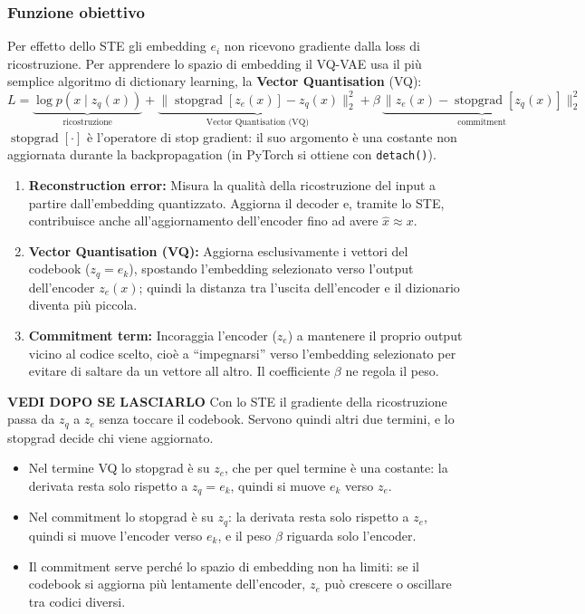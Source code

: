 \documentclass[11pt,a4paper]{article}
\begin{document}
\subsubsection{Funzione obiettivo}

Per effetto dello STE gli embedding $e_i$ non ricevono gradiente dalla loss di ricostruzione. 
Per apprendere lo spazio di embedding il VQ-VAE usa il più semplice algoritmo di dictionary learning, la \textbf{Vector Quantisation} (VQ):
\[
L=\underbrace{\log p(x\mid z_q(x))}_{\text{ricostruzione}}+\underbrace{\|\operatorname{stopgrad}[z_e(x)]-z_q(x)\|_2^2}_{\text{Vector Quantisation (VQ)}}+\beta\,\underbrace{\|z_e(x)-\operatorname{stopgrad}[z_q(x)]\|_2^2}_{\text{commitment}}
\]
$\operatorname{stopgrad}[\cdot]$ è l'operatore di stop gradient: il suo argomento è una costante non
aggiornata durante la backpropagation (in PyTorch si ottiene con \texttt{detach()}).
\begin{enumerate}
  \item \textbf{Reconstruction error:} Misura la qualità della ricostruzione del input a partire
  dall'embedding quantizzato. Aggiorna il decoder e, tramite lo STE,
  contribuisce anche all'aggiornamento dell'encoder fino ad avere $\widehat{x}\approx x$.
  \item \textbf{Vector Quantisation (VQ):} Aggiorna esclusivamente i vettori del codebook ($z_q = e_k$), 
  spostando l'embedding selezionato verso l'output dell'encoder $z_e(x)$; 
  quindi la distanza tra l'uscita dell'encoder e il dizionario diventa più piccola.
  \item \textbf{Commitment term:} Incoraggia l'encoder ($z_e$) a mantenere il proprio output
  vicino al codice scelto, cioè a ``impegnarsi'' verso l'embedding
  selezionato per evitare di saltare da un vettore all altro. Il coefficiente $\beta$ ne regola il peso.

\end{enumerate}

\begin{osservazione} \textbf{VEDI DOPO SE LASCIARLO}
Con lo STE il gradiente della ricostruzione passa da $z_q$ a $z_e$ senza toccare il codebook. Servono quindi
altri due termini, e lo stopgrad decide chi viene aggiornato.
\begin{itemize}
  \item Nel termine VQ lo stopgrad è su $z_e$, che per quel termine è una costante: la derivata resta solo
  rispetto a $z_q=e_k$, quindi si muove $e_k$ verso $z_e$.
  \item Nel commitment lo stopgrad è su $z_q$: la derivata resta solo rispetto a $z_e$, quindi si muove
  l'encoder verso $e_k$, e il peso $\beta$ riguarda solo l'encoder.
  \item Il commitment serve perché lo spazio di embedding non ha limiti: se il codebook si aggiorna più
  lentamente dell'encoder, $z_e$ può crescere o oscillare tra codici diversi.
\end{itemize}
\end{osservazione}
\end{document}
